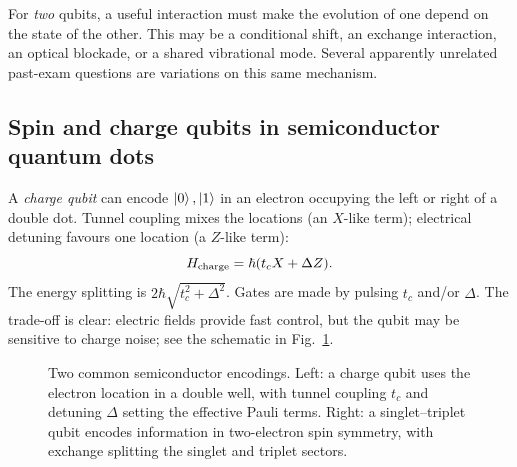 For \emph{two} qubits, a useful interaction must make the evolution of one depend on the state of the other. This may be a conditional shift, an exchange interaction, an optical blockade, or a shared vibrational mode. Several apparently unrelated past-exam questions are variations on this same mechanism.

\subsection{Spin and charge qubits in semiconductor quantum dots}
A \emph{charge qubit} can encode $\left\lvert 0\right\rangle,\left\lvert 1\right\rangle$ in an electron occupying the left or right of a double dot. Tunnel coupling mixes the locations (an $X$-like term); electrical detuning favours one location (a $Z$-like term):
\begin{equation}\label{eq:chargequbit}
H_{\rm charge}=\hbar(t_c X+\Delta Z).
\end{equation}
The energy splitting is $2\hbar\sqrt{t_c^2+\Delta^2}$. Gates are made by pulsing $t_c$ and/or $\Delta$. The trade-off is clear: electric fields provide fast control, but the qubit may be sensitive to charge noise; see the schematic in Fig.~\ref{fig:quantumdot}.

\begin{figure}[t]
\centering
{}
\caption{Two common semiconductor encodings. Left: a charge qubit uses the electron location in a double well, with tunnel coupling $t_c$ and detuning $\Delta$ setting the effective Pauli terms. Right: a singlet--triplet qubit encodes information in two-electron spin symmetry, with exchange splitting the singlet and triplet sectors.}
\label{fig:quantumdot}
\end{figure}

